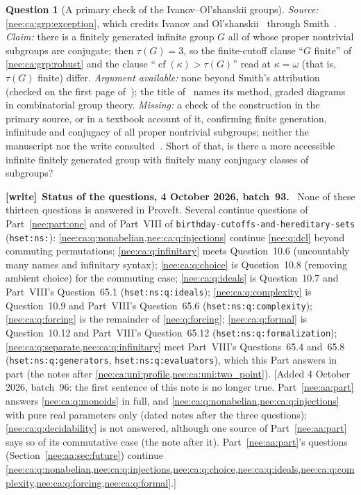\documentclass[11pt,letterpaper]{article}
\numberwithin{equation}{section}
\theoremstyle{plain}
\theoremstyle{definition}
\newtheorem{question}[question]{Question}
\theoremstyle{remark}
\newcommand{\cf}{\operatorname{cf}}
\newenvironment{writenote}[1][]{\par\smallskip\begingroup\small\raggedright
 \setlength{\parindent}{1.25em}\noindent\textbf{[write]}\if\relax\detokenize{#1}\relax\else~\textbf{#1.}\fi\ }%
 {\par\endgroup\smallskip}
\begin{document}
\begin{question}[A primary check of the Ivanov--Ol'shanskii groups]\label{nee:ca:q:primary}
\emph{Source:} \cref{nee:ca:grp:exception}, which credits Ivanov and Ol'shanskii~\cite{IO1991} through Smith~\cite[p.~69]{Smith1995}. \emph{Claim:} there is a finitely generated infinite group $G$ all of whose proper nontrivial subgroups are conjugate; then $\tau(G)=3$, so the finite-cutoff clause ``$G$ finite'' of \cref{nee:ca:grp:robust} and the clause ``$\cf(\kappa)>\tau(G)$'' read at $\kappa=\omega$ (that is, $\tau(G)$ finite) differ. \emph{Argument available:} none beyond Smith's attribution (checked on the first page of~\cite{Smith1995}); the title of~\cite{IO1991} names its method, graded diagrams in combinatorial group theory. \emph{Missing:} a check of the construction in the primary source, or in a textbook account of it, confirming finite generation, infinitude and conjugacy of all proper nontrivial subgroups; neither the manuscript nor the write consulted~\cite{IO1991}. Short of that, is there a more accessible infinite finitely generated group with finitely many conjugacy classes of subgroups?
\end{question}

\begin{writenote}[Status of the questions, 4 October 2026, batch~93]
None of these thirteen questions is answered in ProveIt. Several continue questions of Part~\ref{nee:part:one} and of Part~VIII of \nolinkurl{birthday-cutoffs-and-hereditary-sets} (\texttt{hset:ns:}): \cref{nee:ca:q:nonabelian,nee:ca:q:injections} continue \cref{nee:q:dcl} beyond commuting permutations; \cref{nee:ca:q:infinitary} meets Question~10.6 (uncountably many names and infinitary syntax); \cref{nee:ca:q:choice} is Question~10.8 (removing ambient choice) for the commuting case; \cref{nee:ca:q:ideals} is Question~10.7 and Part~VIII's Question~65.1 (\texttt{hset:ns:q:ideals}); \cref{nee:ca:q:complexity} is Question~10.9 and Part~VIII's Question~65.6 (\texttt{hset:ns:q:complexity}); \cref{nee:ca:q:forcing} is the remainder of \cref{nee:q:forcing}; \cref{nee:ca:q:formal} is Question~10.12 and Part~VIII's Question~65.12 (\texttt{hset:ns:q:formalization}); \cref{nee:ca:q:separate,nee:ca:q:infinitary} meet Part~VIII's Questions~65.4 and~65.8 (\texttt{hset:ns:q:generators}, \texttt{hset:ns:q:evaluators}), which this Part answers in part (the notes after \cref{nee:ca:uni:profile,nee:ca:uni:two_point}). [Added 4 October 2026, batch~96: the first sentence of this note is no longer true. Part~\ref{nee:aa:part} answers \cref{nee:ca:q:monoids} in full, and \cref{nee:ca:q:nonabelian,nee:ca:q:injections} with pure real parameters only (dated notes after the three questions); \cref{nee:ca:q:decidability} is not answered, although one source of Part~\ref{nee:aa:part} says so of its commutative case (the note after it). Part~\ref{nee:aa:part}'s questions (Section~\ref{nee:aa:sec:future}) continue \cref{nee:ca:q:nonabelian,nee:ca:q:injections,nee:ca:q:choice,nee:ca:q:ideals,nee:ca:q:complexity,nee:ca:q:forcing,nee:ca:q:formal}.]
\end{writenote}
\end{document}
